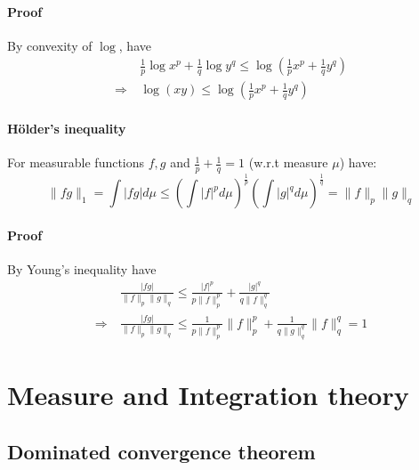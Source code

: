 \documentclass{scrartcl}
\begin{document}
\paragraph{Proof} By convexity of $\log$, have
\begin{equation}
    \begin{split}
        &\frac 1 p \log x^p + \frac 1 q \log y^q \leq \log \left( \frac 1 p x^p + \frac 1 q y^q \right) \\
        \Rightarrow \ &\log ( x y ) \leq \log \left( \frac 1 p x^p + \frac 1 q y^q \right) \nonumber
    \end{split}
\end{equation}

\paragraph{Hölder's inequality} For measurable functions $f, g$ and $\frac 1 p + \frac 1 q = 1$ (w.r.t measure $\mu$) have:
\label{hoelder_inequality}
\begin{equation}
    \| fg \|_1 = \int | fg | d\mu \leq \left( \int |f|^p d\mu \right)^{\frac 1 p} \left( \int |g|^q d\mu \right)^{\frac 1 q} = \|f\|_p \|g\|_q \nonumber
\end{equation}
\paragraph{Proof} By Young's inequality have
\begin{equation}
    \begin{split}
        &\frac {|fg|} {\| f \|_p \| g \|_q} \leq \frac {|f|^p} {p\|f\|_p^p} + \frac {|g|^q} {q\|f\|_q^q} \\
        \Rightarrow \ &\frac {|fg|} {\| f \|_p \| g \|_q} \leq \frac 1 {p \|f\|_p^p} \|f\|_p^p + \frac 1 {q \|g\|_q^q} \|f\|_q^q = 1 \nonumber
    \end{split}
\end{equation}

\section{Measure and Integration theory}

\subsection{Dominated convergence theorem}
\end{document}
